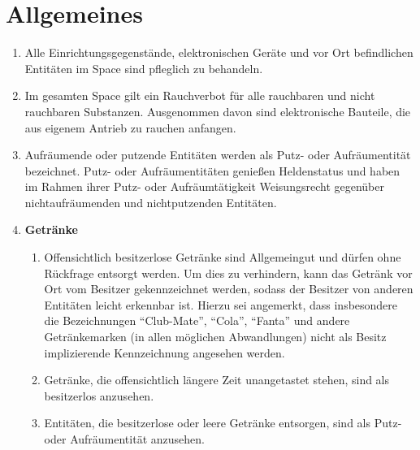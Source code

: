 \documentclass[12pt,a4paper]{scrartcl}
\begin{document}
\section{Allgemeines}
\begin{enumerate}
  \item Alle Einrichtungsgegenstände, elektronischen Geräte und vor Ort
    befindlichen Entitäten im Space sind pfleglich zu behandeln.

  \item Im gesamten Space gilt ein Rauchverbot für alle rauchbaren und nicht
    rauchbaren Substanzen. Ausgenommen davon sind elektronische Bauteile, die
    aus eigenem Antrieb zu rauchen anfangen.

  \item Aufräumende oder putzende Entitäten werden als Putz- oder Aufräumentität
    bezeichnet. Putz- oder Aufräumentitäten genießen Heldenstatus und haben im
    Rahmen ihrer Putz- oder Aufräumtätigkeit Weisungsrecht gegenüber
    nichtaufräumenden und nichtputzenden Entitäten.

  \item\textbf{Getränke}\begin{enumerate}
    \item Offensichtlich besitzerlose Getränke sind Allgemeingut und dürfen ohne
      Rückfrage entsorgt werden. Um dies zu verhindern, kann das Getränk vor Ort
      vom Besitzer gekennzeichnet werden, sodass der Besitzer von anderen
      Entitäten leicht erkennbar ist. Hierzu sei angemerkt, dass insbesondere
      die Bezeichnungen "`Club-Mate"', "`Cola"', "`Fanta"' und andere
      Getränkemarken (in allen möglichen Abwandlungen) nicht als Besitz
      implizierende Kennzeichnung angesehen werden.
    \item Getränke, die offensichtlich längere Zeit unangetastet stehen, sind
      als besitzerlos anzusehen.
    \item Entitäten, die besitzerlose oder leere Getränke entsorgen, sind als
      Putz- oder Aufräumentität anzusehen.
  \end{enumerate}


\end{enumerate}
\end{document}
